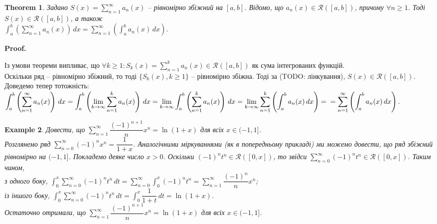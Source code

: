 \documentclass[a4paper, 10pt]{article}
\makeatletter
\def\huge{\displaystyle}
\def\qed{$\blacksquare$}
\theoremstyle{theoremdd}
\newtheorem{theorem}{Theorem}[subsection]
\theoremstyle{theoremdd}
\theoremstyle{theoremdd}
\theoremstyle{theoremdd}
\theoremstyle{theoremdd}
\newtheorem{example}[theorem]{Example}
\theoremstyle{theoremdd}
\theoremstyle{theoremdd}
\theoremstyle{theoremdd}
\theoremstyle{theoremdd}
\renewenvironment{proof}[1][Proof.\\]{\par
\pushQED{\hfill \qed}%
\normalfont \topsep6\p@\@plus6\p@\relax
\trivlist
\item\relax
{\bfseries
#1\@addpunct{.}}\hspace\labelsep\ignorespaces
}{%
\popQED\endtrivlist\@endpefalse
}
\makeatother
\begin{document}
\begin{theorem}
Задано $S(x) = \huge \sum_{n=1}^\infty a_n(x)$ -- рівномірно збіжний на $[a,b]$. Відомо, що $a_n(x) \in \mathcal{R}([a,b])$, причому $\forall n \geq 1$. Тоді $S(x) \in \mathcal{R}([a,b])$, а також\\
$\huge \int_a^b \left( \sum_{n=1}^\infty a_n(x) \right) \,dx = \sum_{n=1}^\infty \left( \int_a^b a_n(x)\,dx \right)$.
\end{theorem}

\begin{proof}
Із умови теореми випливає, що $\forall k \geq 1: S_k(x) = \huge \sum_{n=1}^k a_n(x) \in \mathcal{R}([a,b])$ як сума інтегрованих функцій.\\
Оскільки ряд -- рівномірно збіжний, то тоді $\{S_k(x), k \geq 1\}$ -- рівномірно збіжна. Тоді за (TODO: лінкування), $S(x) \in \mathcal{R}([a,b])$. Доведемо тепер тотожність:\\
$\huge \int_a^b \left( \sum_{n=1}^\infty a_n(x) \right) \,dx = \int_a^b \left( \lim_{k \to \infty} \sum_{n=1}^k a_n(x) \right) \,dx = \lim_{k \to \infty} \int_a^b \left( \sum_{n=1}^k a_n(x) \right) \,dx = \lim_{k \to \infty} \sum_{n=1}^k \left( \int_a^b a_n(x)\,dx \right) = \\ = \sum_{n=1}^\infty \left( \int_a^b a_n(x)\,dx \right)$.
\end{proof}

\begin{example}
Довести, що $\huge\sum_{n=1}^\infty \dfrac{(-1)^{n+1}}{n}x^n = \ln (1+x)$ для всіх $x \in (-1,1]$.\\
Розглянемо ряд $\huge\sum_{n=0}^\infty (-1)^n x^n = \dfrac{1}{1+x}$. Аналогічними міркуваннями (як в попередньому прикладі) ми можемо довести, що ряд збіжний рівномірно на $(-1,1]$. Покладемо деяке число $x > 0$. Оскільки $(-1)^n t^n \in \mathcal{R}([0,x])$, то звідси $\huge\sum_{n=0}^\infty (-1)^n t^n \in \mathcal{R}([0,x])$. Таким чином,\\
з одного боку, $\huge\int_0^x \huge\sum_{n=0}^\infty (-1)^n t^n \,dt = \sum_{n=0}^\infty \int_0^x (-1)^n t^n = \sum_{n=1}^\infty \dfrac{(-1)^n}{n}x^n$;\\
із іншого боку, $\huge\int_0^x \huge\sum_{n=0}^\infty (-1)^n t^n \,dt = \int_0^x \dfrac{1}{1+t}\,dt = \ln (1+x)$.\\
Остаточно отримали, що $\huge\sum_{n=1}^\infty \dfrac{(-1)^{n+1}}{n}x^n = \ln (1+x)$ для всіх $x \in (-1,1]$.
\end{example}
\end{document}
